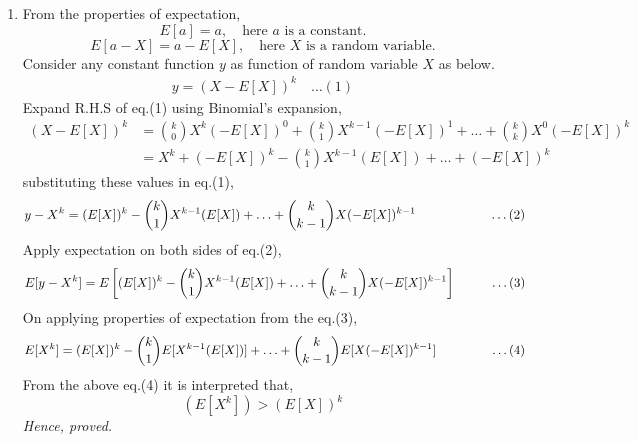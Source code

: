 \documentclass{article}
\begin{document}
\begin{enumerate}
\newpage
\item 
    From the properties of expectation,    
    \[
        E[a] = a, \quad \text{here } a \text{ is a constant.}
    \]
    \[
        E[a - X] = a - E[X], \quad \text{here } X \text{ is a random variable.}
    \]
    Consider any constant function \( y \) as function of random variable \( X \) as below.
    \begin{align*}
        y = (X - E[X])^k \quad \ldots (1)
    \end{align*} 
    Expand R.H.S of eq.(1) using Binomial's expansion,
    \begin{align*}
        (X - E[X])^k 
        &= \binom{k}{0}X^k(-E[X])^0 + \binom{k}{1}X^{k-1}(-E[X])^1 + \ldots + \binom{k}{k}X^0(-E[X])^k \\
        &= X^k + (-E[X])^k - \binom{k}{1}X^{k-1}(E[X]) + \ldots + (-E[X])^k
    \end{align*}
    substituting these values in eq.(1),
    \begin{equation*}
        y - X^k = (E[X])^k - \binom{k}{1}X^{k-1}(E[X]) + \ldots + \binom{k}{k-1}X(-E[X])^{k-1} \hspace{20mm}\ldots (2)
    \end{equation*} 
    Apply expectation on both sides of eq.(2),
    \begin{equation*}
        E[y - X^k] = E\left[(E[X])^k - \binom{k}{1}X^{k-1}(E[X]) + \ldots + \binom{k}{k-1}X(-E[X])^{k-1}\right] \hspace{10mm}\ldots (3)
    \end{equation*}  
    On applying properties of expectation from the eq.(3), 
    \begin{equation*}
        E[X^k] = (E[X])^k - \binom{k}{1}E[X^{k-1}(E[X])] + \ldots + \binom{k}{k-1}E[X(-E[X])^{k-1}] \hspace{15mm}\ldots (4)
    \end{equation*}
    From the above eq.(4) it is interpreted that,
    \begin{equation*}
        (E[X^k]) > (E[X])^k
    \end{equation*}
    \textit{Hence, proved.}


\end{enumerate}
\end{document}
